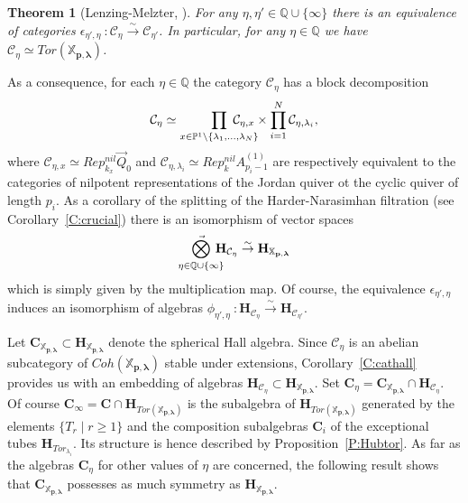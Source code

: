 \documentclass[a4paper,10pt]{amsart}
\def\Q{\mathbb{Q}}
\def\H{\mathbf{H}}
\def\CC{\mathbf{C}}
\def\xpl{\mathbb{X}_{\mathbf{p},\boldsymbol{\lambda}}}
\newtheorem{theo}{\bf{Theorem}}[section]
\numberwithin{equation}{section}
\begin{document}
{\vspace{.1in}

\begin{theo}[Lenzing-Melzter, \cite{LM}]\label{T:LMa} For any $\eta,\eta' \in \Q \cup \{\infty\}$ there is an equivalence of categories $\epsilon_{\eta',\eta}~:\mathcal{C}_{\eta} \stackrel{\sim}{\to} \mathcal{C}_{\eta'}$. In particular, for any $\eta \in \Q$ we have $\mathcal{C}_{\eta} \simeq Tor(\xpl)$.
\end{theo}

\vspace{.15in}

As a consequence, for each $\eta \in \Q$ the category $\mathcal{C}_{\eta}$ has a block decomposition
$$\mathcal{C}_{\eta} \simeq \prod_{x \in \mathbb{P}^1 \backslash \{\lambda_1, \ldots, \lambda_N\}} \hspace{-.3in}\mathcal{C}_{\eta,x} \times \prod_{i=1}^N \mathcal{C}_{\eta,\lambda_i},$$
where $\mathcal{C}_{\eta,x} \simeq Rep^{nil}_{k_x}\vec{Q}_0$ and $\mathcal{C}_{\eta,\lambda_i} \simeq Rep^{nil}_kA_{p_i-1}^{(1)}$ are respectively equivalent to the categories of nilpotent representations of the Jordan quiver ot the cyclic quiver of length $p_i$. As a corollary of the splitting of the Harder-Narasimhan filtration (see Corollary~\ref{C:crucial}) there is an isomorphism of vector spaces
$$\mathop{\vec{\bigotimes}}_{{\eta \in \Q \cup \{\infty\}}} \hspace{-.12in}\H_{\mathcal{C}_{\eta}} \stackrel{\sim}{\to} \H_{\xpl}$$
which is simply given by the multiplication map. Of course, the equivalence $\epsilon_{\eta',\eta}$ induces an isomorphism of algebras $\phi_{\eta',\eta}~:\H_{\mathcal{C}_{\eta}} \stackrel{\sim}{\to} \H_{\mathcal{C}_{\eta'}}$.

\vspace{.15in}

Let $\CC_{\xpl} \subset \H_{\xpl}$ denote the spherical Hall algebra. Since $\mathcal{C}_{\eta}$ is an abelian subcategory of $Coh(\xpl)$ stable under extensions, Corollary~\ref{C:cathall} provides us with an embedding of algebras $\H_{\mathcal{C}_{\eta}} \subset \H_{\xpl}$. Set $\CC_{\eta}=\CC_{\xpl} \cap \H_{\mathcal{C}_{\eta}}$. Of course $\CC_{\infty} =\CC \cap \H_{Tor(\xpl)}$ is the subalgebra of $\H_{Tor(\xpl)}$ generated by the elements $\{T_r\;|\; r \geq 1\}$ and the composition subalgebras $\CC_i$ of the exceptional tubes $\H_{Tor_{\lambda_i}}$. Its structure is hence described by Proposition~\ref{P:Hubtor}.  As far as the algebras $\CC_{\eta}$ for other values of $\eta$ are concerned, the following result shows that $\CC_{\xpl}$ possesses as much symmetry as $\H_{\xpl}$.

}
\end{document}
